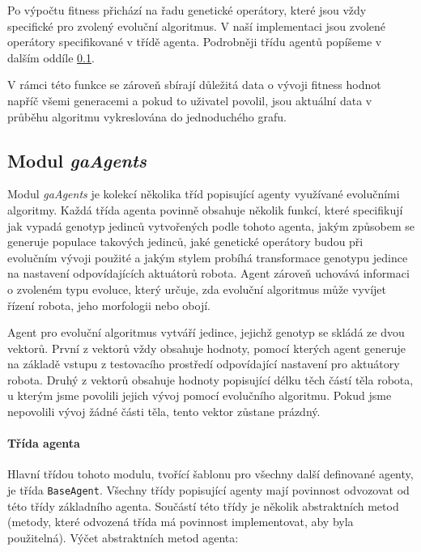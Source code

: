 Po výpočtu fitness přichází na řadu genetické operátory, které jsou vždy
specifické pro zvolený evoluční algoritmus. V naší implementaci jsou zvolené
operátory specifikované v třídě agenta. Podrobněji třídu agentů
popíšeme v dalším oddíle \ref{imp:gaAgents}.

V rámci této funkce se zároveň sbírají důležitá data o vývoji fitness hodnot
napříč všemi generacemi a pokud to uživatel povolil, jsou aktuální data v
průběhu algoritmu vykreslována do jednoduchého grafu.

\subsection{Modul \emph{gaAgents}} \label{imp:gaAgents}
Modul \emph{gaAgents} je kolekcí několika tříd popisující agenty využívané
evolučními algoritmy. Každá třída agenta povinně obsahuje několik funkcí, které
specifikují jak vypadá genotyp jedinců vytvořených podle tohoto agenta, jakým
způsobem se generuje populace takových jedinců, jaké genetické operátory budou
při evolučním vývoji použité a jakým stylem probíhá transformace genotypu
jedince na nastavení odpovídajících aktuátorů robota. Agent zároveň uchovává
informaci o zvoleném typu evoluce, který určuje, zda evoluční algoritmus může
vyvíjet řízení robota, jeho morfologii nebo obojí.

Agent pro evoluční algoritmus vytváří jedince, jejichž genotyp se skládá ze
dvou vektorů. První z vektorů vždy obsahuje hodnoty, pomocí kterých agent
generuje na základě vstupu z testovacího prostředí odpovídající nastavení pro
aktuátory robota. Druhý z vektorů obsahuje hodnoty popisující délku těch částí
těla robota, u kterým jsme povolili jejich vývoj pomocí evolučního algoritmu.
Pokud jsme nepovolili vývoj žádné části těla, tento vektor zůstane prázdný.

\paragraph{Třída agenta}
Hlavní třídou tohoto modulu, tvořící šablonu pro všechny další definované
agenty, je třída \texttt{BaseAgent}. Všechny třídy popisující agenty mají
povinnost odvozovat od této třídy základního agenta. Součástí této třídy je
několik abstraktních metod (metody, které odvozená třída má povinnost
implementovat, aby byla použitelná). Výčet abstraktních metod agenta:

